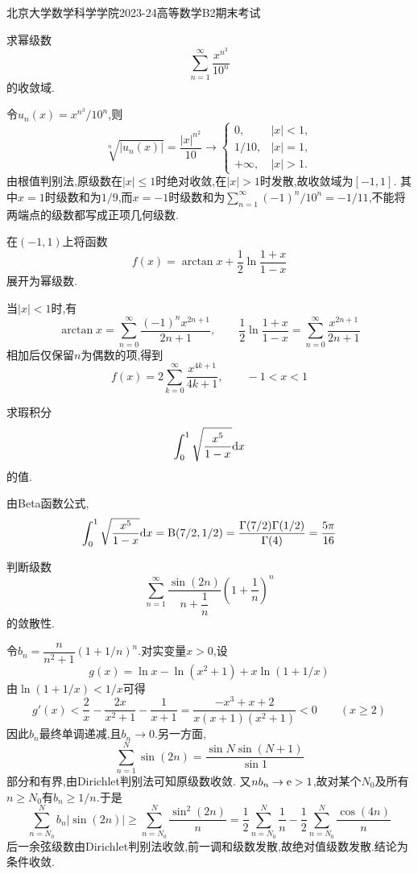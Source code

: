 \documentclass{ctexart}
\begin{document}
\pagestyle{empty}
\begin{center}\Large
    北京大学数学科学学院2023-24高等数学B2期末考试
\end{center}
\begin{problem}[1.(10\songti{分})]
求幂级数
        \[\sum_{n=1}^{\infty}\dfrac{x^{n^3}}{10^n}\]
        的收敛域.
\end{problem}
\begin{solution}
令$u_n(x)=x^{n^3}/10^n$,则
\[\sqrt[n]{|u_n(x)|}=\frac{|x|^{n^2}}{10}\to
\begin{cases}0,&|x|<1,\\1/10,&|x|=1,\\+\infty,&|x|>1.\end{cases}\]
由根值判别法,原级数在$|x|\leqslant1$时绝对收敛,在$|x|>1$时发散,故收敛域为$[-1,1]$.
其中$x=1$时级数和为$1/9$,而$x=-1$时级数和为$\sum_{n=1}^{\infty}(-1)^n/10^n=-1/11$,不能将两端点的级数都写成正项几何级数.
\end{solution}

\begin{problem}[2.(10\songti{分})]
在$(-1,1)$上将函数
        \[f(x)=\arctan x+\dfrac12\ln\dfrac{1+x}{1-x}\]
        展开为幂级数.
\end{problem}
\begin{solution}
当$|x|<1$时,有
\[\arctan x=\sum_{n=0}^{\infty}\frac{(-1)^nx^{2n+1}}{2n+1},\qquad
\frac12\ln\frac{1+x}{1-x}=\sum_{n=0}^{\infty}\frac{x^{2n+1}}{2n+1}\]
相加后仅保留$n$为偶数的项,得到
\[f(x)=2\sum_{k=0}^{\infty}\frac{x^{4k+1}}{4k+1},\qquad -1<x<1\]
\end{solution}

\begin{problem}[3.(10\songti{分})]
求瑕积分
        \[\int_0^1\sqrt{\dfrac{x^5}{1-x}}\mathrm{d} x\]
        的值.
\end{problem}
\begin{solution}
由Beta函数公式,
\[\int_0^1\sqrt{\frac{x^5}{1-x}}\mathrm{d} x
=\mathrm B(7/2,1/2)=\frac{\Gamma(7/2)\Gamma(1/2)}{\Gamma(4)}=\frac{5\pi}{16}\]
\end{solution}

\begin{problem}[4.(10\songti{分})]
判断级数
        \[\sum_{n=1}^{\infty}\dfrac{\sin(2n)}{n+\dfrac1n}\left(1+\dfrac1n\right)^n\]
        的敛散性.
\end{problem}
\begin{solution}
令$b_n=\dfrac{n}{n^2+1}(1+1/n)^n$.对实变量$x>0$,设
\[g(x)=\ln x-\ln(x^2+1)+x\ln(1+1/x)\]
由$\ln(1+1/x)<1/x$可得
\[g'(x)<\frac2x-\frac{2x}{x^2+1}-\frac1{x+1}
=\frac{-x^3+x+2}{x(x+1)(x^2+1)}<0\qquad(x\geqslant2)\]
因此$b_n$最终单调递减,且$b_n\to0$.另一方面,
\[\sum_{n=1}^N\sin(2n)=\frac{\sin N\sin(N+1)}{\sin1}\]
部分和有界,由Dirichlet判别法可知原级数收敛.
又$nb_n\to\mathrm{e}>1$,故对某个$N_0$及所有$n\geqslant N_0$有$b_n\geqslant1/n$.于是
\[\sum_{n=N_0}^N b_n|\sin(2n)|\geqslant
\sum_{n=N_0}^N\frac{\sin^2(2n)}n
=\frac12\sum_{n=N_0}^N\frac1n-\frac12\sum_{n=N_0}^N\frac{\cos(4n)}n\]
后一余弦级数由Dirichlet判别法收敛,前一调和级数发散,故绝对值级数发散.结论为条件收敛.
\end{solution}
\end{document}
